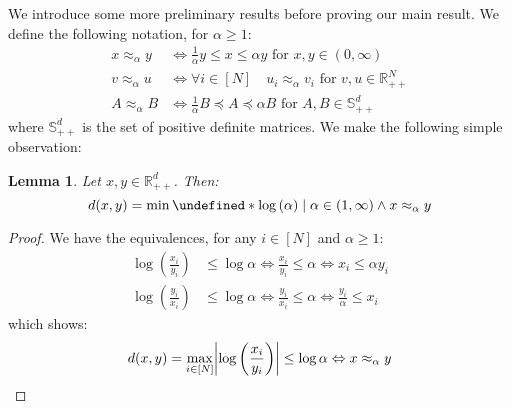 \documentclass{article}
\theoremstyle{plain}
\newtheorem{lemma}{Lemma}
\theoremstyle{definition}
\theoremstyle{remark}
\let\brace\undefined
\DeclarePairedDelimiter{\brace}{\lbrace}{\rbrace}
\newcommand{\R}{\mathbb{R}}
\newcommand{\logp}[1]{\log{\left(#1\right)}}
\DeclarePairedDelimiter{\abs}{\lvert}{\rvert}
\begin{document}
We introduce some more preliminary results before proving our main result. We define the following notation, for $\alpha \geq 1$:
\begin{align*}
    x \approx_{\alpha} y &\Leftrightarrow \frac{1}{\alpha} y \leq x \leq \alpha y \text{ for } x,y \in (0, \infty) \\
    v \approx_{\alpha} u &\Leftrightarrow \forall i \in [N] \quad u_i \approx_{\alpha} v_i \text{ for } v, u \in \R_{++}^{N} \\
    A \approx_{\alpha} B &\Leftrightarrow \frac{1}{\alpha} B \preceq A \preceq \alpha B \text{ for } A, B \in \mathbb{S}_{++}^{d}
\end{align*}
where $\mathbb{S}_{++}^{d}$ is the set of positive definite matrices. We make the following simple observation:
\begin{lemma}
\label{lem:7}
    Let $x, y \in \R_{++}^{d}$. Then:
    \begin{equation*}
        d(x, y) = \min{\brace*{\logp{\alpha} \mid \alpha \in (1, \infty) \land x \approx_{\alpha} y}}
    \end{equation*}
\end{lemma}
\begin{proof}
    We have the equivalences, for any $i \in [N]$ and $\alpha \geq 1$:
    \begin{align*}
        \logp{\frac{x_i}{y_i}} &\leq \log{\alpha} \Leftrightarrow \frac{x_i}{y_i} \leq \alpha \Leftrightarrow x_i \leq \alpha y_i \\
        \logp{\frac{y_i}{x_i}} &\leq \log{\alpha} \Leftrightarrow \frac{y_i}{x_i} \leq \alpha \Leftrightarrow \frac{y_i}{\alpha} \leq x_i
    \end{align*}
    which shows:
    \begin{equation*}
        d(x, y) = \max_{i \in [N]} \abs*{\logp{\frac{x_i}{y_i}}} \leq \log{\alpha} \Leftrightarrow x \approx_{\alpha} y
    \end{equation*}
\end{proof}
\end{document}
